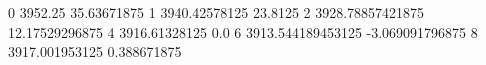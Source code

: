 0 3952.25 35.63671875
1 3940.42578125 23.8125
2 3928.78857421875 12.17529296875
4 3916.61328125 0.0
6 3913.544189453125 -3.069091796875
8 3917.001953125 0.388671875
